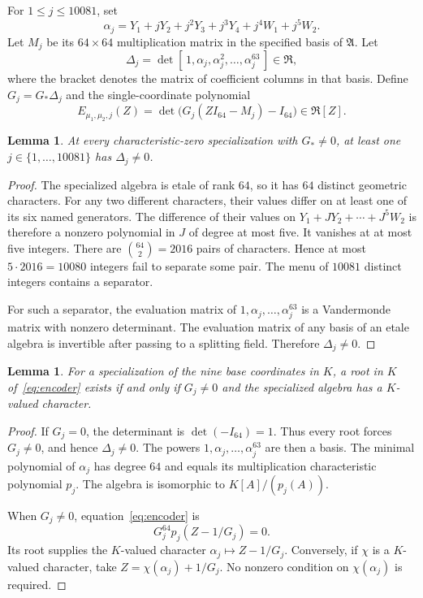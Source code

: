 \documentclass[11pt,a4paper]{article}
\newtheorem{lemma}[theorem]{Lemma}
\begin{document}
For \(1\le j\le10081\), set
\[
 \alpha_j=Y_1+jY_2+j^2Y_3+j^3Y_4+j^4W_1+j^5W_2.
\]
Let \(M_j\) be its \(64\times64\) multiplication matrix in the specified
basis of \(\mathfrak A\). Let
\[
 \Delta_j=\det[\,1,\alpha_j,\alpha_j^2,\ldots,\alpha_j^{63}\,]
                 \in\mathfrak R,
\]
where the bracket denotes the matrix of coefficient columns in that
basis. Define \(G_j=G_*\Delta_j\) and the single-coordinate polynomial
\begin{equation}\label{eq:encoder}
           E_{\mu_1,\mu_2,j}(Z)
           =\det\bigl(G_j(ZI_{64}-M_j)-I_{64}\bigr)
           \in\mathfrak R[Z].
\end{equation}

\begin{lemma}\label{lem:separator}
At every characteristic-zero specialization with \(G_*\ne0\), at least
one \(j\in\{1,\ldots,10081\}\) has \(\Delta_j\ne0\).
\end{lemma}
\begin{proof}
The specialized algebra is etale of rank \(64\), so it has \(64\)
distinct geometric characters. For any two different characters,
their values differ on at least one of its six named generators.
The difference of their values on
\(Y_1+JY_2+\cdots+J^5W_2\) is therefore a nonzero polynomial in \(J\)
of degree at most five. It vanishes at at most five integers.
There are \(\binom{64}{2}=2016\) pairs of characters. Hence at most
\(5\cdot2016=10080\) integers fail to separate some pair.
The menu of \(10081\) distinct integers contains a separator.

For such a separator, the evaluation matrix of
\(1,\alpha_j,\ldots,\alpha_j^{63}\) is a Vandermonde matrix with
nonzero determinant. The evaluation matrix of any basis of an etale
algebra is invertible after passing to a splitting field. Therefore
\(\Delta_j\ne0\).
\end{proof}

\begin{lemma}\label{lem:encoder}
For a specialization of the nine base coordinates in \(K\), a root
in \(K\) of~\eqref{eq:encoder} exists if and only if
\(G_j\ne0\) and the specialized algebra has a \(K\)-valued character.
\end{lemma}
\begin{proof}
If \(G_j=0\), the determinant is \(\det(-I_{64})=1\).
Thus every root forces \(G_j\ne0\), and hence \(\Delta_j\ne0\).
The powers \(1,\alpha_j,\ldots,\alpha_j^{63}\) are then a basis.
The minimal polynomial of \(\alpha_j\) has degree \(64\) and equals
its multiplication characteristic polynomial \(p_j\). The algebra is
isomorphic to \(K[A]/(p_j(A))\).

When \(G_j\ne0\), equation~\eqref{eq:encoder} is
\[
              G_j^{64}p_j(Z-1/G_j)=0.
\]
Its root supplies the \(K\)-valued character
\(\alpha_j\mapsto Z-1/G_j\). Conversely, if \(\chi\) is a
\(K\)-valued character, take \(Z=\chi(\alpha_j)+1/G_j\).
No nonzero condition on \(\chi(\alpha_j)\) is required.
\end{proof}
\end{document}
